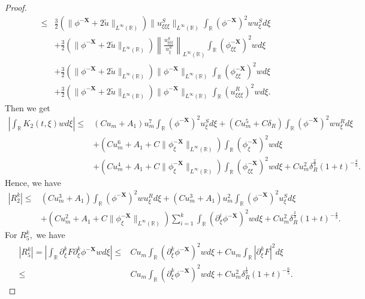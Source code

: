 \documentclass[10pt,reqno]{amsart}
\numberwithin{equation}{section}
\begin{document}
\begin{proof}
\begin{align*}
			\leq&\frac{3}{2}\left(\|\phi^{-\mathbf{X}}+2\tilde{u}\|_{L^{\infty}(\mathbb{R})}\right)\|u^S_{\xi\xi\xi}\|_{L^{\infty}(\mathbb{R})}\int_{\mathbb{R}}(\phi^{-\mathbf{X}})^2wu^S_{\xi}d\xi\\
			&+\frac{3}{2}\left(\|\phi^{-\mathbf{X}}+2\tilde{u}\|_{L^{\infty}(\mathbb{R})}\right)\left\lVert\frac{u^S_{\xi\xi\xi}}{u^S_{\xi}}\right\rVert_{L^{\infty}(\mathbb{R})}\int_{\mathbb{R}}(\phi_{\xi\xi}^{-\mathbf{X}})^{2}wd\xi\\
			&+\frac{3}{2}\left(\|\phi^{-\mathbf{X}}+2\tilde{u}\|_{L^{\infty}(\mathbb{R})}\right)\|\phi^{-\mathbf{X}}\|_{L^{\infty}(\mathbb{R})}\int_{\mathbb{R}}(\phi_{\xi\xi}^{-\mathbf{X}})^{2}wd\xi\\
			&+\frac{3}{2}\left(\|\phi^{-\mathbf{X}}+2\tilde{u}\|_{L^{\infty}(\mathbb{R})}\right)\|\phi^{-\mathbf{X}}\|_{L^{\infty}(\mathbb{R})}\int_{\mathbb{R}}(u^R_{\xi\xi\xi})^2wd\xi.
		\end{align*}
		Then we get
		\begin{align*}
			\left|\int_{\mathbb{R}}K_2(t,\xi)wd\xi\right|\leq& (Cu_m+A_1)u_m^7\int_{\mathbb{R}}(\phi^{-\mathbf{X}})^2u^S_{\xi}d\xi+(Cu_m^5+C\delta_R)\int_{\mathbb{R}}(\phi^{-\mathbf{X}})^2wu^R_{\xi}d\xi\\
			&+\left(Cu_m^6+A_1+C\|\phi_{\xi}^{-\mathbf{X}}\|_{L^{\infty}(\mathbb{R})}\right)\int_{\mathbb{R}}(\phi_{\xi}^{-\mathbf{X}})^2wd\xi\\
			&+\left(Cu_m^4+A_1+C\|\phi_{\xi}^{-\mathbf{X}}\|_{L^{\infty}(\mathbb{R})}\right)\int_{\mathbb{R}}(\phi_{\xi\xi}^{-\mathbf{X}})^2wd\xi+Cu_m^2\delta_{R}^{\frac{2}{3}}(1+t)^{-\frac{4}{3}}.
		\end{align*}
		Hence, we have
		\begin{align*}
			\left|R_2^k\right|\leq &(Cu_m^3+A_1)\int_{\mathbb{R}}(\phi^{-\mathbf{X}})^2wu^R_{\xi}d\xi+(Cu_m^3+A_1)u_m^2\int_{\mathbb{R}}(\phi^{-\mathbf{X}})^2u^S_{\xi}d\xi\\
			&+\left(Cu_m^2+A_1+C\|\phi_{\xi}^{-\mathbf{X}}\|_{L^{\infty}(\mathbb{R})}\right)\sum_{i=1}^{k}\int_{\mathbb{R}}(\partial_{\xi}^i\phi^{-\mathbf{X}})^2wd\xi+Cu_m^2\delta_R^{\frac{2}{3}}(1+t)^{-\frac{4}{3}}.
		\end{align*}
		For $R_5^k,$ we have
		\begin{align*}
			\left|R_5^k\right|=\left|\int_{\mathbb{R}}\partial_{\xi}^kF\partial_{\xi}^k\phi^{-\mathbf{X}}wd\xi\right|
			\leq&Cu_m\int_{\mathbb{R}}(\partial_{\xi}^k\phi^{-\mathbf{X}})^2wd\xi+Cu_m\int_{\mathbb{R}}\left|\partial_{\xi}^kF\right|^2d\xi\\
			\leq&Cu_m\int_{\mathbb{R}}(\partial_{\xi}^k\phi^{-\mathbf{X}})^2wd\xi+Cu_m^2\delta_{R}^{\frac{1}{6}}(1+t)^{-\frac{6}{5}}. 

\end{align*}
\end{proof}
\end{document}
